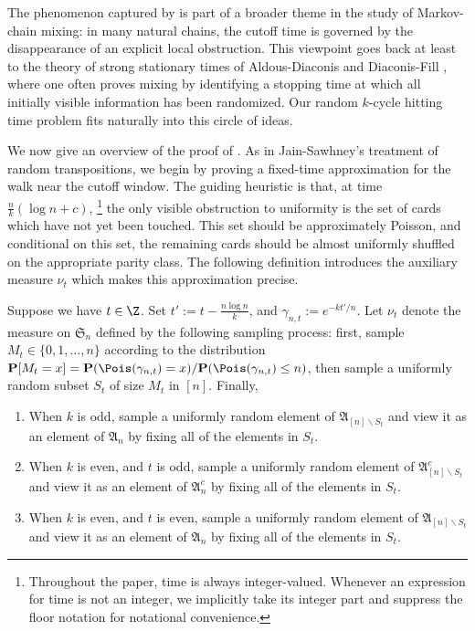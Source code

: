 The phenomenon captured by  is part of a broader theme in the study of Markov-chain mixing: in many natural chains, the cutoff time is governed by the disappearance of an explicit local obstruction. This viewpoint goes back at least to the theory of strong stationary times of Aldous-Diaconis \cite{aldous1986shuffling} and Diaconis-Fill \cite{diaconis1990strong}, where one often proves mixing by identifying a stopping time at which all initially visible information has been randomized. Our random $k$-cycle hitting time problem fits naturally into this circle of ideas.

We now give an overview of the proof of . As in Jain-Sawhney's treatment of
random transpositions, we begin by proving a fixed-time approximation for the
walk near the cutoff window. The guiding heuristic is that, at time
$\frac{n}{k}(\log n+c)$, \footnote{Throughout the paper, time is always integer-valued. Whenever an expression for time is not an integer, we implicitly take its integer part and suppress the floor notation for notational convenience.} the only visible obstruction to uniformity is the set of cards which have not yet been touched. This set should be approximately Poisson, and conditional on this set, the remaining cards should be almost uniformly shuffled on the appropriate parity class. The following definition introduces the auxiliary measure $\nu_t$ which makes this approximation precise.

\begin{defi}\label{defi: construction of nu}
Suppose we have $t\in\Z$. Set $t':=t-\frac{n\log n}{k}$, and $\gamma_{n,t}:=e^{-kt'/n}$. Let $\nu_t$ denote the measure on $\mathfrak{S}_n$ defined by the following sampling process: first, sample $M_t\in\{0,1,\ldots,n\}$ according to the distribution $\mathbf{P}[M_t=x]=\mathbf{P}(\Pois(\gamma_{n,t})=x)/\mathbf{P}(\Pois(\gamma_{n,t})\le n)$, then sample a uniformly random subset $S_t$ of size $M_t$ in $[n]$. Finally,
\begin{enumerate}
\item When $k$ is odd, sample a uniformly random element of $\mathfrak{A}_{[n]\backslash S_t}$ and view it as an element of $\mathfrak{A}_n$ by fixing all of the elements in $S_t$.
\item When $k$ is even, and $t$ is odd, sample a uniformly random element of $\mathfrak{A}_{[n]\backslash S_t}^c$ and view it as an element of $\mathfrak{A}_n^c$ by fixing all of the elements in $S_t$.
\item When $k$ is even, and $t$ is even, sample a uniformly random element of $\mathfrak{A}_{[n]\backslash S_t}$ and view it as an element of $\mathfrak{A}_n$ by fixing all of the elements in $S_t$.
\end{enumerate}
\end{defi}

